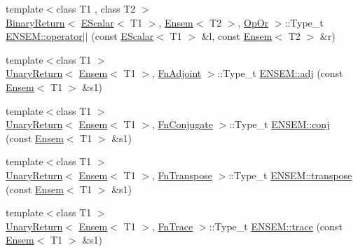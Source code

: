 \begin{DoxyCompactItemize}
\item 
{\footnotesize template$<$class T1 , class T2 $>$ }\\\mbox{\hyperlink{structENSEM_1_1BinaryReturn}{Binary\+Return}}$<$ \mbox{\hyperlink{classENSEM_1_1EScalar}{E\+Scalar}}$<$ T1 $>$, \mbox{\hyperlink{classENSEM_1_1Ensem}{Ensem}}$<$ T2 $>$, \mbox{\hyperlink{structENSEM_1_1OpOr}{Op\+Or}} $>$\+::Type\+\_\+t \mbox{\hyperlink{group__eensem_ga433f0b529c387d8299dd5c8eb5a9b3b0}{E\+N\+S\+E\+M\+::operator$\vert$$\vert$}} (const \mbox{\hyperlink{classENSEM_1_1EScalar}{E\+Scalar}}$<$ T1 $>$ \&l, const \mbox{\hyperlink{classENSEM_1_1Ensem}{Ensem}}$<$ T2 $>$ \&r)
\item 
{\footnotesize template$<$class T1 $>$ }\\\mbox{\hyperlink{structENSEM_1_1UnaryReturn}{Unary\+Return}}$<$ \mbox{\hyperlink{classENSEM_1_1Ensem}{Ensem}}$<$ T1 $>$, \mbox{\hyperlink{structENSEM_1_1FnAdjoint}{Fn\+Adjoint}} $>$\+::Type\+\_\+t \mbox{\hyperlink{group__eensem_ga3c4b288659953aefecfc3a19bb11f326}{E\+N\+S\+E\+M\+::adj}} (const \mbox{\hyperlink{classENSEM_1_1Ensem}{Ensem}}$<$ T1 $>$ \&s1)
\item 
{\footnotesize template$<$class T1 $>$ }\\\mbox{\hyperlink{structENSEM_1_1UnaryReturn}{Unary\+Return}}$<$ \mbox{\hyperlink{classENSEM_1_1Ensem}{Ensem}}$<$ T1 $>$, \mbox{\hyperlink{structENSEM_1_1FnConjugate}{Fn\+Conjugate}} $>$\+::Type\+\_\+t \mbox{\hyperlink{group__eensem_ga539331970eb8111bc1c56f049612dce8}{E\+N\+S\+E\+M\+::conj}} (const \mbox{\hyperlink{classENSEM_1_1Ensem}{Ensem}}$<$ T1 $>$ \&s1)
\item 
{\footnotesize template$<$class T1 $>$ }\\\mbox{\hyperlink{structENSEM_1_1UnaryReturn}{Unary\+Return}}$<$ \mbox{\hyperlink{classENSEM_1_1Ensem}{Ensem}}$<$ T1 $>$, \mbox{\hyperlink{structENSEM_1_1FnTranspose}{Fn\+Transpose}} $>$\+::Type\+\_\+t \mbox{\hyperlink{group__eensem_gae77f21b6732b95bacf62ceb754c5ac17}{E\+N\+S\+E\+M\+::transpose}} (const \mbox{\hyperlink{classENSEM_1_1Ensem}{Ensem}}$<$ T1 $>$ \&s1)
\item 
{\footnotesize template$<$class T1 $>$ }\\\mbox{\hyperlink{structENSEM_1_1UnaryReturn}{Unary\+Return}}$<$ \mbox{\hyperlink{classENSEM_1_1Ensem}{Ensem}}$<$ T1 $>$, \mbox{\hyperlink{structENSEM_1_1FnTrace}{Fn\+Trace}} $>$\+::Type\+\_\+t \mbox{\hyperlink{group__eensem_ga11991a607d48e08d8be636503c1f5d20}{E\+N\+S\+E\+M\+::trace}} (const \mbox{\hyperlink{classENSEM_1_1Ensem}{Ensem}}$<$ T1 $>$ \&s1)
\item 

\end{DoxyCompactItemize}
